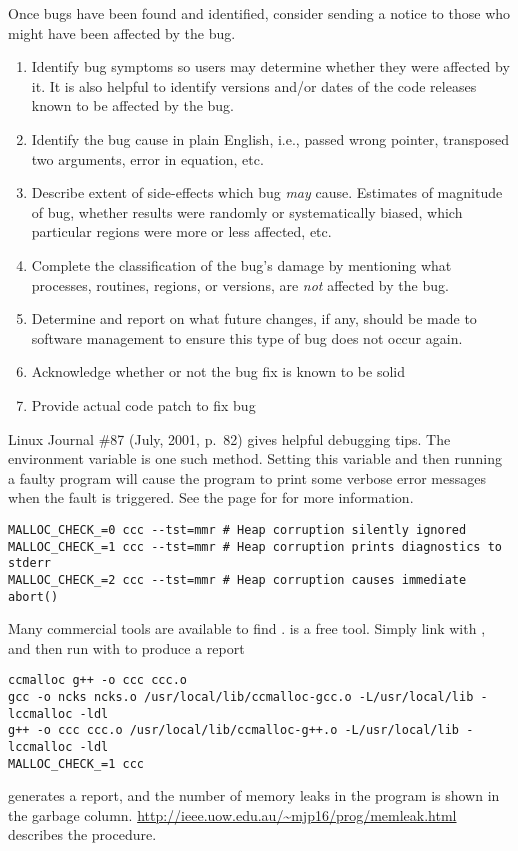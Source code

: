 \documentclass[12pt,twoside]{article}
\begin{document}
Once bugs have been found and identified, consider sending a notice to
those who might have been affected by the bug.
\begin{enumerate}
\item Identify bug symptoms so users may determine whether they
were affected by it. 
It is also helpful to identify versions and/or dates of the code
releases known to be affected by the bug.
\item Identify the bug cause in plain English, i.e., passed wrong
pointer, transposed two arguments, error in equation, etc.
\item Describe extent of side-effects which bug \textit{may} cause.
Estimates of magnitude of bug, whether results were randomly or
systematically biased, which particular regions were more or less
affected, etc.
\item Complete the classification of the bug's damage by mentioning
what processes, routines, regions, or versions, are \textit{not}
affected by the bug. 
\item Determine and report on what future changes, if any, should be 
made to software management to ensure this type of bug does not occur
again. 
\item Acknowledge whether or not the bug fix is known to be solid
\item Provide actual code patch to fix bug
\end{enumerate}

Linux Journal \#87 (July, 2001, p.~82) gives helpful debugging tips.
The  environment variable is one such method.
Setting this variable and then running a faulty program will cause
the program to print some verbose error messages when the fault is
triggered. 
See the  page for  for more information.
\begin{verbatim}
MALLOC_CHECK_=0 ccc --tst=mmr # Heap corruption silently ignored
MALLOC_CHECK_=1 ccc --tst=mmr # Heap corruption prints diagnostics to stderr
MALLOC_CHECK_=2 ccc --tst=mmr # Heap corruption causes immediate abort()
\end{verbatim}

Many commercial tools are available to find .
 is a free tool.
Simply link with , and then run with 
 to produce a report
\begin{verbatim}
ccmalloc g++ -o ccc ccc.o
gcc -o ncks ncks.o /usr/local/lib/ccmalloc-gcc.o -L/usr/local/lib -lccmalloc -ldl
g++ -o ccc ccc.o /usr/local/lib/ccmalloc-g++.o -L/usr/local/lib -lccmalloc -ldl
MALLOC_CHECK_=1 ccc
\end{verbatim}
 generates a report, and the number of memory leaks
in the program is shown in the garbage column.
\url{http://ieee.uow.edu.au/~mjp16/prog/memleak.html} describes the procedure.
\end{document}
